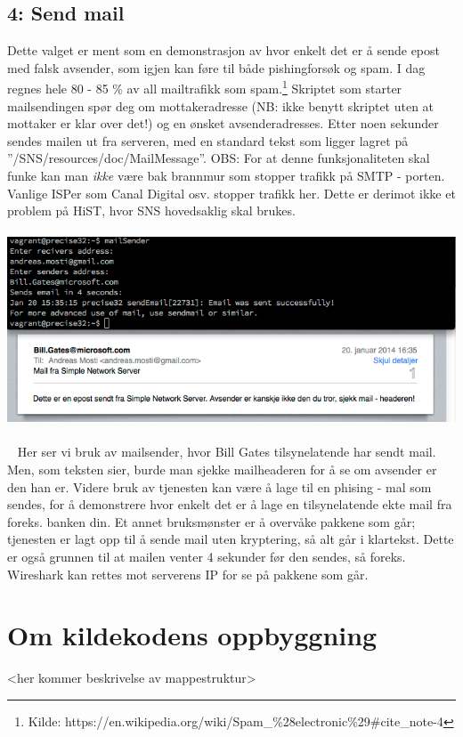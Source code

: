 \documentclass{article}
\begin{document}
\subsection{4: Send mail}
Dette valget er ment som en demonstrasjon av hvor enkelt det er å sende epost med falsk avsender, som igjen kan føre til både pishingforsøk og spam. I dag regnes hele 80 - 85 \% av all mailtrafikk som spam.\footnote{Kilde: https://en.wikipedia.org/wiki/Spam_\%28electronic\%29#cite_note-4} Skriptet som starter mailsendingen spør deg om mottakeradresse (NB: ikke benytt skriptet uten at mottaker er klar over det!) og en ønsket avsenderadresses. Etter noen sekunder sendes mailen ut fra serveren, med en standard tekst som ligger lagret på ''/SNS/resources/doc/MailMessage''. OBS: For at denne funksjonaliteten skal funke kan man \textit{ikke} være bak brannmur som stopper trafikk på SMTP - porten. Vanlige ISPer som Canal Digital osv. stopper trafikk her. Dette er derimot ikke et problem på HiST, hvor SNS hovedsaklig skal brukes. 
\\ \\
\includegraphics[scale = 0.7]{mailsender.png}
\\ \\ 
Her ser vi bruk av mailsender, hvor Bill Gates tilsynelatende har sendt mail. Men, som teksten sier, burde man sjekke mailheaderen for å se om avsender er den han er. Videre bruk av tjenesten kan være å lage til en phising - mal som sendes, for å demonstrere hvor enkelt det er å lage en tilsynelatende ekte mail fra foreks. banken din. Et annet bruksmønster er å overvåke pakkene som går; tjenesten er lagt opp til å sende mail uten kryptering, så alt går i klartekst. Dette er også grunnen til at mailen venter 4 sekunder før den sendes, så foreks. Wireshark kan rettes mot serverens IP for se på pakkene som går. 
\section{Om kildekodens oppbyggning}
<her kommer beskrivelse av mappestruktur>
\end{document}
